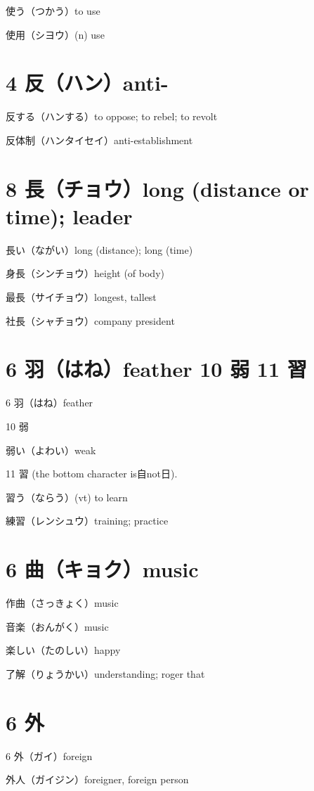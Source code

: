 使う（つかう）to use

使用（シヨウ）(n) use

\section{4 反（ハン）anti-}

反する（ハンする）to oppose; to rebel; to revolt

反体制（ハンタイセイ）anti-establishment

\section{8 長（チョウ）long (distance or time); leader}

長い（ながい）long (distance); long (time)

身長（シンチョウ）height (of body)

最長（サイチョウ）longest, tallest

社長（シャチョウ）company president

\section{6 羽（はね）feather 10 弱 11 習}

6 羽（はね）feather

10 弱

弱い（よわい）weak

11 習 (the bottom character is自not日).

習う（ならう）(vt) to learn

練習（レンシュウ）training; practice

\section{6 曲（キョク）music}

作曲（さっきょく）music

音楽（おんがく）music

楽しい（たのしい）happy

了解（りょうかい）understanding; roger that

\section{6 外}

6 外（ガイ）foreign

外人（ガイジン）foreigner, foreign person

